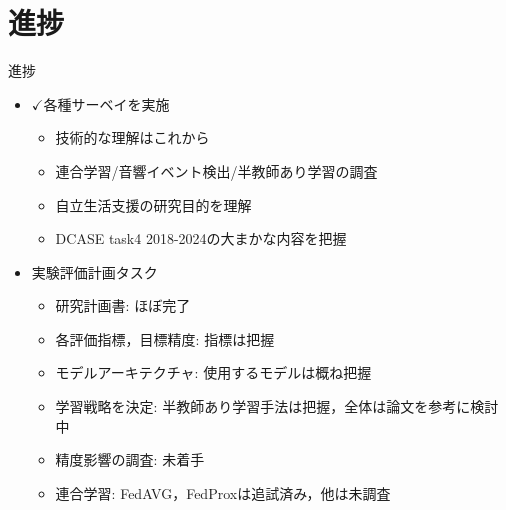 \documentclass[unicode,12pt,aspectratio=169,dvipdfmx]{beamer}
\begin{document}
\section{進捗}
\begin{frame}{進捗}
    \begin{itemize}
        \item $\checkmark$各種サーベイを実施
        \begin{itemize}
            \item 技術的な理解はこれから
            \item 連合学習/音響イベント検出/半教師あり学習の調査
            \item 自立生活支援の研究目的を理解
            \item DCASE task4 2018-2024の大まかな内容を把握
        \end{itemize}    
        \item 実験評価計画タスク    
        \begin{itemize}
            \item 研究計画書: ほぼ完了
            \item 各評価指標，目標精度: 指標は把握
            \item モデルアーキテクチャ: 使用するモデルは概ね把握
            \item 学習戦略を決定: 半教師あり学習手法は把握，全体は論文を参考に検討中
            \item 精度影響の調査: 未着手
            \item 連合学習: FedAVG，FedProxは追試済み，他は未調査
        \end{itemize}    
    \end{itemize}
\end{frame}

\begin{frame}[allowframebreaks]
\printbibliography
\end{frame}
\end{document}
